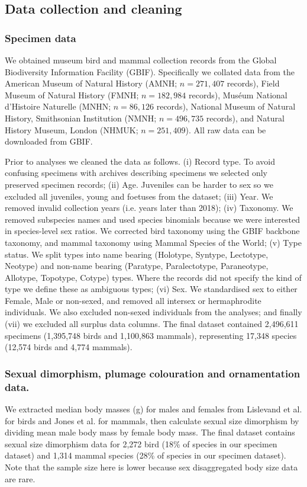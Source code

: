 \documentclass[a4paper, 12pt]{article}
\begin{document}
\subsection{Data collection and cleaning}
\subsubsection{Specimen data} 
We obtained museum bird and mammal collection records from the Global Biodiversity Information Facility (GBIF\cite{gbif}). 
Specifically we collated data from the American Museum of Natural History (AMNH; $n = 271,407$ records\cite{amnh-birds,amnh-mammals}), Field Museum of Natural History (FMNH; $n = 182,984$ records\cite{fmnh-birds,fmnh-mammals}), Mus\'{e}um National d'Histoire Naturelle (MNHN; $n = 86,126$ records\cite{mnhn-birds,mnhn-mammals}), National Museum of Natural History, Smithsonian Institution (NMNH; $n = 496,735$ records\cite{smithsonian-both}), and Natural History Museum, London (NHMUK; $n = 251,409$\cite{nhm-all}).
 All raw data can be downloaded from GBIF\cite{gbif}.

Prior to analyses we cleaned the data as follows. 
(i) Record type. To avoid confusing specimens with archives describing specimens we selected only preserved specimen records; 
(ii) Age. Juveniles can be harder to sex so we excluded all juveniles, young and foetuses from the dataset; 
(iii) Year. We removed invalid collection years (i.e. years later than 2018); 
(iv) Taxonomy. We removed subspecies names and used species binomials because we were  interested in species-level sex ratios. We corrected bird taxonomy using the GBIF backbone taxonomy\cite{gbif}, and mammal taxonomy using Mammal Species of the World\cite{wilson2005mammal}; 
(v) Type status. We split types into name bearing (Holotype, Syntype, Lectotype, Neotype) and non-name bearing (Paratype, Paralectotype, Paraneotype, Allotype, Topotype, Cotype) types. Where the records did not specify the kind of type we define these as ambiguous types; 
(vi) Sex. We standardised sex to either Female, Male or non-sexed, and removed all intersex or hermaphrodite individuals. 
We also excluded non-sexed individuals from the analyses; and finally 
(vii) we excluded all surplus data columns. 
The final dataset contained 2,496,611 specimens (1,395,748 birds and 1,100,863 mammals), representing 17,348 species (12,574 birds and 4,774 mammals). 

\subsubsection{Sexual dimorphism, plumage colouration and ornamentation data.}
We extracted median body masses (g) for males and females from Lislevand et al.\cite{lislevand2007avian} for birds and Jones et al.\cite{pantheria} for mammals, then calculate sexual size dimorphism by dividing mean male body mass by female body mass. 
The final dataset contains sexual size dimorphism data for 2,272 bird (18\% of species in our specimen dataset) and 1,314 mammal species (28\% of species in our specimen dataset). 
Note that the sample size here is lower because sex disaggregated body size data are rare.
\end{document}
